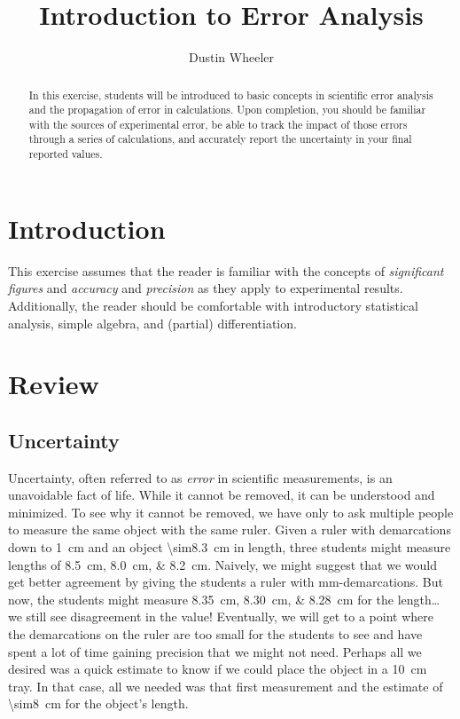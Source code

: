 \documentclass[nobib,nofonts,nols,nohyper]{tufte-handout}
\title{Introduction to Error Analysis}
\author{Dustin Wheeler}
\begin{document}
\maketitle

\begin{abstract}
	\noindent
	In this exercise, students will be introduced to basic concepts in scientific error analysis and the propagation of error in calculations. 
	Upon completion, you should be familiar with the sources of experimental error, be able to track the impact of those errors through a series of calculations, and accurately report the uncertainty in your final reported values. %
\end{abstract}

\section{Introduction} %
\label{sec:intro}

This exercise assumes that the reader is familiar with the concepts of \emph{significant figures} and \emph{accuracy} and \emph{precision} as they apply to experimental results. 
Additionally, the reader should be comfortable with introductory statistical analysis, simple algebra, and (partial) differentiation. 



\section{Review} %
\label{sec:review}

\subsection{Uncertainty} %
\label{sub:uncertainty}

Uncertainty, often referred to as \emph{error} in scientific measurements, is an unavoidable fact of life. 
While it cannot be removed, it can be understood and minimized. 
To see why it cannot be removed, we have only to ask multiple people to measure the same object with the same ruler. 
Given a ruler with demarcations down to \qty{1}{\cm} and an object \qty{\sim8.3}{\cm} in length, three students might measure lengths of \SIlist{8.5;8.0;8.2}{\cm}. 
Naively, we might suggest that we would get better agreement by giving the students a ruler with \unit{\mm}-demarcations. 
But now, the students might measure \SIlist{8.35;8.30;8.28}{\cm} for the length… we still see disagreement in the value! 
Eventually, we will get to a point where the demarcations on the ruler are too small for the students to see and have spent a lot of time gaining precision that we might not need.
Perhaps all we desired was a quick estimate to know if we could place the object in a \qty{10}{\cm} tray. 
In that case, all we needed was that first measurement and the estimate of \qty{\sim8}{\cm} for the object's length. 
\end{document}
